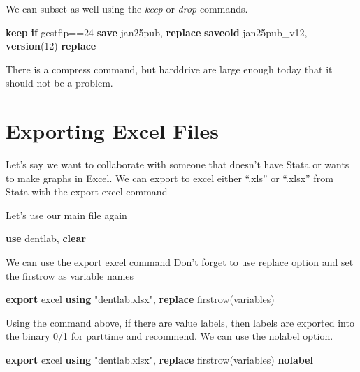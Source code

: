 \documentclass[
]{book}
\newenvironment{Shaded}{\begin{snugshade}}{\end{snugshade}}
\newcommand{\KeywordTok}[1]{\textcolor[rgb]{0.13,0.29,0.53}{\textbf{#1}}}
\newcommand{\NormalTok}[1]{#1}
\newcommand{\StringTok}[1]{\textcolor[rgb]{0.31,0.60,0.02}{#1}}
\begin{document}
We can subset as well using the \emph{keep} or \emph{drop} commands.

\begin{Shaded}
\begin{Highlighting}[]
\KeywordTok{keep} \KeywordTok{if}\NormalTok{ gestfip==24}
\KeywordTok{save}\NormalTok{ jan25pub, }\KeywordTok{replace}
\KeywordTok{saveold}\NormalTok{ jan25pub\_v12, }\KeywordTok{version}\NormalTok{(12) }\KeywordTok{replace}
\end{Highlighting}
\end{Shaded}

There is a compress command, but harddrive are large enough today that it
should not be a problem.

\section{Exporting Excel Files}\label{exporting-excel-files}

Let's say we want to collaborate with someone that doesn't have Stata or
wants to make graphs in Excel. We can export to excel either ``.xls'' or
``.xlsx'' from Stata with the export excel command

Let's use our main file again

\begin{Shaded}
\begin{Highlighting}[]
\KeywordTok{use}\NormalTok{ dentlab, }\KeywordTok{clear}
\end{Highlighting}
\end{Shaded}

We can use the export excel command
Don't forget to use replace option and set the firstrow as variable names

\begin{Shaded}
\begin{Highlighting}[]
\KeywordTok{export}\NormalTok{ excel }\KeywordTok{using} \StringTok{"dentlab.xlsx"}\NormalTok{, }\KeywordTok{replace}\NormalTok{ firstrow(variables)}
\end{Highlighting}
\end{Shaded}

Using the command above, if there are value labels, then labels are exported into the binary 0/1 for parttime and recommend.
We can use the nolabel option.

\begin{Shaded}
\begin{Highlighting}[]
\KeywordTok{export}\NormalTok{ excel }\KeywordTok{using} \StringTok{"dentlab.xlsx"}\NormalTok{, }\KeywordTok{replace}\NormalTok{ firstrow(variables) }\KeywordTok{nolabel}
\end{Highlighting}
\end{Shaded}
\end{document}
